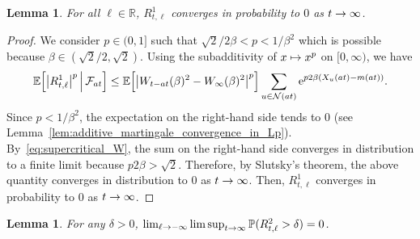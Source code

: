 \documentclass[10pt]{amsart}
\newtheorem{lemm}[theo]{Lemma}\newtheorem{prop}[theo]{Proposition}\newtheorem{coro}[theo]{Corollary}\newtheorem{conj}[theo]{Conjecture}
\theoremstyle{definition}\newtheorem{defi}[theo]{Definition}\newtheorem{rema}[theo]{Remark}\newtheorem{exam}[theo]{Example}\newtheorem{exem}[theo]{Example}\newtheorem{nota}[theo]{Notation}
\newcommand{\e}{\mathrm{e}}
\newcommand{\E}{\mathbb{E}}
\renewcommand{\P}{\mathbb{P}}
\newcommand{\R}{\mathbb{R}}
\newcommand\1{\mathds{1}}
\newcommand{\cF}{\mathcal{F}}
\newcommand{\cN}{\mathcal{N}}
\newcommand{\Expec}[1]{\mathbb{E}\left[#1\right]}
\let\originalleft\left
\let\originalright\right
\renewcommand{\left}{\mathopen{}\mathclose\bgroup\originalleft}
\renewcommand{\right}{\aftergroup\egroup\originalright}
\renewcommand*{\to}{\mathchoice{\longrightarrow}{\rightarrow}{\rightarrow}{\rightarrow}}
\let\oldmapsto\mapsto
\renewcommand*{\mapsto}{\mathchoice{\longmapsto}{\oldmapsto}{\oldmapsto}{\oldmapsto}}
\begin{document}
\pagebreak

\begin{lemm}\label{lem:renormalized_subcritical_overlap_replacement}
For all $\ell \in \R$, $R_{t, \ell}^1$ converges in probability to $0$ as $t \to \infty$.
\end{lemm}

\begin{proof}
We consider $p \in (0,1]$ such that $\sqrt{2}/2\beta < p < 1/\beta^2$ which is possible because $\beta \in (\sqrt{2}/2, \sqrt{2})$. Using the subadditivity of $x \mapsto x^p$ on $[0, \infty)$, we have
\begin{equation*}
\E \left[\left|R_{t, \ell}^1\right|^p \,\middle|\, \cF_{at} \right]
\leq \Expec{ \left|W_{t - at}(\beta)^2 - W_\infty(\beta)^2\right|^p } \sum_{u \in \cN(at)} \e^{p2\beta(X_u(at) - m(at))}.
\end{equation*}
Since $p <1/\beta^2$, the expectation on the right-hand side tends to 0 (see Lemma~\ref{lem:additive_martingale_convergence_in_Lp}). By~\eqref{eq:supercritical_W}, the sum on the right-hand side converges in distribution to a finite limit because $p 2\beta > \sqrt{2}$. Therefore, by Slutsky's theorem, the above quantity converges in distribution to $0$ as $t \to \infty$. Then, $R_{t, \ell}^1$ converges in probability to $0$ as $t \to \infty$.
\end{proof}

\begin{lemm}\label{lem:renormalized_subcritical_overlap_contribution}
For any $\delta > 0$, $\lim_{\ell \to -\infty} \limsup_{t \to \infty} \P(R_{t,\ell}^2 > \delta) = 0$.
\end{lemm}
\end{document}
